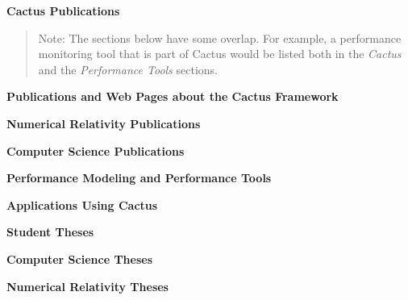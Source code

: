 \documentclass[11pt, tightenlines]{revtex4}
\begin{document}
{\LARGE\bf Cactus Publications}

\begin{quote}
  Note: The sections below have some overlap.  For example, a
  performance monitoring tool that is part of Cactus would be listed
  both in the \emph{Cactus} and the \emph{Performance Tools} sections.
\end{quote}



\hrulefill

{\large\bf Publications and Web Pages about the Cactus Framework}

\begin{enumerate}
  
  
\end{enumerate}



\hrulefill

{\large\bf Numerical Relativity Publications}

\begin{enumerate}
  
\end{enumerate}



\hrulefill

{\large\bf Computer Science Publications}

\begin{enumerate}
  
\end{enumerate}



\hrulefill

{\large\bf Performance Modeling and Performance Tools}

\begin{enumerate}
  
\end{enumerate}



\hrulefill

{\large\bf Applications Using Cactus}

\begin{enumerate}
  
\end{enumerate}



\hrulefill

{\large\bf Student Theses}

\begin{enumerate}
  
\end{enumerate}



\hrulefill

{\large\bf Computer Science Theses}

\begin{enumerate}
  
\end{enumerate}



\hrulefill

{\large\bf Numerical Relativity Theses}

\begin{enumerate}
  
\end{enumerate}
\end{document}
